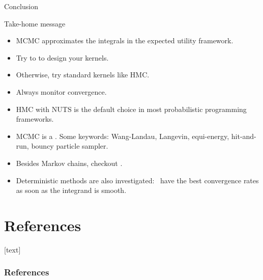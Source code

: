 \documentclass[10pt]{beamer}
\let\oldcitep=\citep
\renewcommand\citep[1]{\hyperlink{#1}{\textcolor{vert}{\oldcitep{#1}}}}
\begin{document}
\begin{frame}{Conclusion}
\begin{block}{Take-home message}
  \begin{itemize}
    \item MCMC approximates the integrals in the expected utility framework.
    \item Try to  to design your kernels.
    \item Otherwise, try standard kernels like HMC.
    \item Always monitor convergence.
  \end{itemize}
\end{block}

  \begin{itemize}
  \item HMC with NUTS is the default choice in most probabilistic programming frameworks.
  \item MCMC is a . Some keywords: Wang-Landau, Langevin, equi-energy, hit-and-run, bouncy particle sampler.
  \item Besides Markov chains, checkout  \citep{DeDoJa06}.
  \item Deterministic methods are also investigated:  \citep{DiPi10} have the best convergence rates as soon as the integrand is smooth.
\end{itemize}
\end{frame}


\section*{References}
[text]%
\begin{frame}[allowframebreaks]
\frametitle{References}
\small
\printbibliography
\normalsize
\end{frame}
\end{document}
